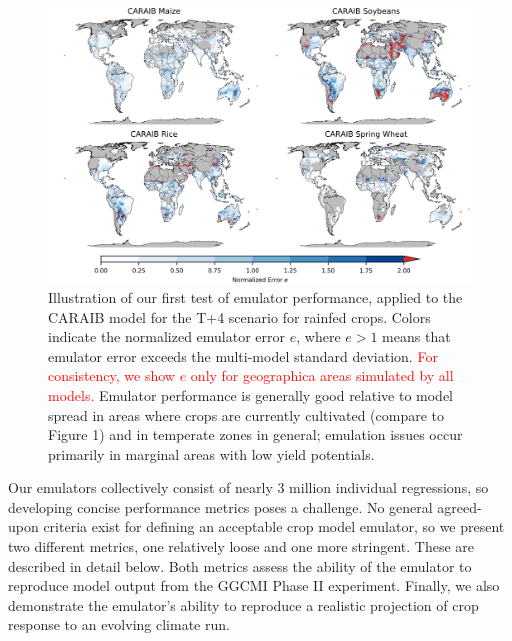 \documentclass[gmd, manuscript]{copernicus} %
\begin{document}
\begin{figure}[ht]
\centering
    \includegraphics[width=16.3cm]{figures/CARAIB_spatial_error.png}
    \caption{
    Illustration of our first test of emulator performance, applied to the CARAIB model for the T+4 scenario for rainfed crops. 
    Colors indicate the normalized emulator error $e$, where $e > 1$ means that emulator error exceeds the multi-model standard deviation. 
	\textcolor{red}{For consistency, we show $e$ only for geographica areas simulated by all models.} %
    Emulator performance is generally good relative to model spread in areas where crops are currently cultivated (compare to Figure 1) and in temperate zones in general; emulation issues occur primarily in marginal areas with low yield potentials. 
    }
   \label{fig:error}
\end{figure}

Our emulators collectively consist of nearly 3 million individual regressions, so developing concise performance metrics poses a challenge.
No general agreed-upon criteria exist for defining an acceptable crop model emulator, so we present two different metrics, one relatively loose %
and one more stringent. 
These are described in detail below. Both metrics assess the ability of the emulator to reproduce model output from the GGCMI Phase II experiment. 
Finally, we also demonstrate the emulator's ability to reproduce a realistic projection of crop response to an evolving climate run. 
\end{document}
